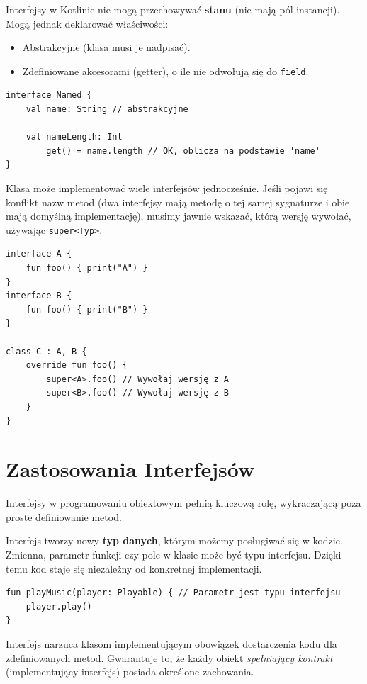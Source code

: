 Interfejsy w Kotlinie nie mogą przechowywać \textbf{stanu} (nie mają pól instancji). Mogą jednak deklarować właściwości:
\begin{itemize}
    \item Abstrakcyjne (klasa musi je nadpisać).
    \item Zdefiniowane akcesorami (getter), o ile nie odwołują się do \texttt{field}.
\end{itemize}

\begin{verbatim}
interface Named {
    val name: String // abstrakcyjne
    
    val nameLength: Int
        get() = name.length // OK, oblicza na podstawie 'name'
}
\end{verbatim}

Klasa może implementować wiele interfejsów jednocześnie. Jeśli pojawi się konflikt nazw metod (dwa interfejsy mają metodę o tej samej sygnaturze i obie mają domyślną implementację), musimy jawnie wskazać, którą wersję wywołać, używając \texttt{super<Typ>}.

\begin{verbatim}
interface A {
    fun foo() { print("A") }
}
interface B {
    fun foo() { print("B") }
}

class C : A, B {
    override fun foo() {
        super<A>.foo() // Wywołaj wersję z A
        super<B>.foo() // Wywołaj wersję z B
    }
}
\end{verbatim}

\section{Zastosowania Interfejsów}

Interfejsy w programowaniu obiektowym pełnią kluczową rolę, wykraczającą poza proste definiowanie metod.

Interfejs tworzy nowy \textbf{typ danych}, którym możemy posługiwać się w kodzie. Zmienna, parametr funkcji czy pole w klasie może być typu interfejsu. Dzięki temu kod staje się niezależny od konkretnej implementacji.

\begin{verbatim}
fun playMusic(player: Playable) { // Parametr jest typu interfejsu
    player.play()
}
\end{verbatim}

Interfejs narzuca klasom implementującym obowiązek dostarczenia kodu dla zdefiniowanych metod. Gwarantuje to, że każdy obiekt \textit{spełniający kontrakt} (implementujący interfejs) posiada określone zachowania.

